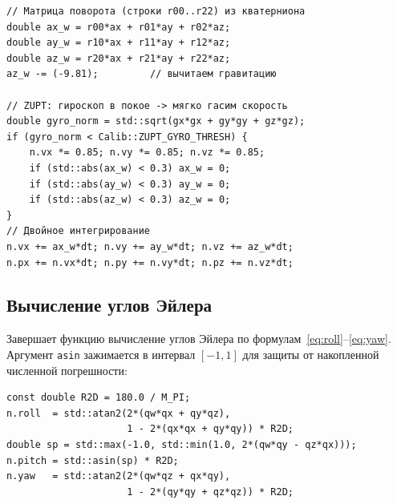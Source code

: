 \documentclass[../main.tex]{subfiles}
\begin{document}
\begin{lstlisting}[caption={Мировое ускорение, компенсация гравитации и ZUPT}]
// Матрица поворота (строки r00..r22) из кватерниона
double ax_w = r00*ax + r01*ay + r02*az;
double ay_w = r10*ax + r11*ay + r12*az;
double az_w = r20*ax + r21*ay + r22*az;
az_w -= (-9.81);         // вычитаем гравитацию
 
// ZUPT: гироскоп в покое -> мягко гасим скорость
double gyro_norm = std::sqrt(gx*gx + gy*gy + gz*gz);
if (gyro_norm < Calib::ZUPT_GYRO_THRESH) {
    n.vx *= 0.85; n.vy *= 0.85; n.vz *= 0.85;
    if (std::abs(ax_w) < 0.3) ax_w = 0;
    if (std::abs(ay_w) < 0.3) ay_w = 0;
    if (std::abs(az_w) < 0.3) az_w = 0;
}
// Двойное интегрирование
n.vx += ax_w*dt; n.vy += ay_w*dt; n.vz += az_w*dt;
n.px += n.vx*dt; n.py += n.vy*dt; n.pz += n.vz*dt;
\end{lstlisting}
 
\subsection{Вычисление углов Эйлера}
 
Завершает функцию вычисление углов Эйлера по
формулам~\eqref{eq:roll}--\eqref{eq:yaw}. Аргумент \texttt{asin}
зажимается в интервал $[-1,1]$ для защиты от накопленной численной
погрешности:
 
\begin{lstlisting}[caption={Углы Эйлера из кватерниона (ZYX)}]
const double R2D = 180.0 / M_PI;
n.roll  = std::atan2(2*(qw*qx + qy*qz),
                     1 - 2*(qx*qx + qy*qy)) * R2D;
double sp = std::max(-1.0, std::min(1.0, 2*(qw*qy - qz*qx)));
n.pitch = std::asin(sp) * R2D;
n.yaw   = std::atan2(2*(qw*qz + qx*qy),
                     1 - 2*(qy*qy + qz*qz)) * R2D;
\end{lstlisting}
	
\end{document}
